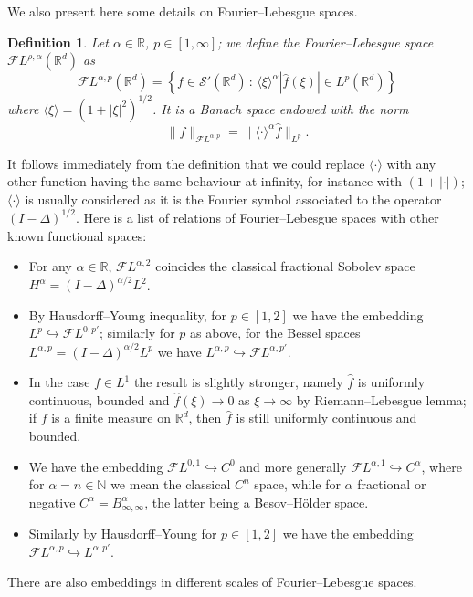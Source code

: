 \documentclass[10pt]{article}
\newtheorem{definition}[theorem]{Definition}
\begin{document}
We also present here some details on Fourier--Lebesgue spaces.

\begin{definition}
  \label{appendixA2 defn fourier lebesgue} Let $\alpha \in \mathbb{R}$, $p \in
  [1, \infty]$; we define the Fourier--Lebesgue space $\mathcal{F} L^{\rho,
  \alpha} (\mathbb{R}^d)$ as
  \[ \mathcal{F} L^{\alpha, p} (\mathbb{R}^d) = \left\{ f \in \mathcal{S}'
     (\mathbb{R}^d) \, : \, \langle \xi \rangle^{\alpha} | \hat{f} (\xi) | \in
     L^p (\mathbb{R}^d) \right\} \]
  where $\langle \xi \rangle = (1 + | \xi |^2)^{1 / 2}$. It is a Banach space
  endowed with the norm
  \[ \| f \|_{\mathcal{F} L^{\alpha, p}} = \| \langle \cdot \rangle^{\alpha}
     \hat{f} \|_{L^p} . \]
\end{definition}

It follows immediately from the definition that we could replace $\langle
\cdot \rangle$ with any other function having the same behaviour at infinity,
for instance with $(1 + | \cdot |)$; $\langle \cdot \rangle$ is usually
considered as it is the Fourier symbol associated to the operator $(I -
\Delta)^{1 / 2}$. Here is a list of relations of Fourier--Lebesgue spaces with
other known functional spaces:
\begin{itemize}
  \item For any $\alpha \in \mathbb{R}$, $\mathcal{F} L^{\alpha, 2}$ coincides
  the classical fractional Sobolev space $H^{\alpha} = (I - \Delta)^{\alpha /
  2} L^2$.
  
  \item By Hausdorff--Young inequality, for $p \in [1, 2]$ we have the
  embedding $L^p \hookrightarrow \mathcal{F} L^{0, p'}$; similarly for $p$ as
  above, for the Bessel spaces $L^{\alpha, p} = (I - \Delta)^{\alpha / 2} L^p$
  we have $L^{\alpha, p} \hookrightarrow \mathcal{F} L^{\alpha, p'}$.
  
  \item In the case $f \in L^1$ the result is slightly stronger, namely
  $\hat{f}$ is uniformly continuous, bounded and $\hat{f} (\xi) \rightarrow 0$
  as $\xi \rightarrow \infty$ by Riemann--Lebesgue lemma; if $f$ is a finite
  measure on $\mathbb{R}^d$, then $\hat{f}$ is still uniformly continuous and
  bounded.
  
  \item We have the embedding $\mathcal{F} L^{0, 1} \hookrightarrow C^0$ and
  more generally $\mathcal{F} L^{\alpha, 1} \hookrightarrow C^{\alpha}$, where
  for $\alpha = n \in \mathbb{N}$ we mean the classical $C^n$ space, while for
  $\alpha$ fractional or negative $C^{\alpha} = B^{\alpha}_{\infty, \infty}$,
  the latter being a Besov--H\"{o}lder space.
  
  \item Similarly by Hausdorff--Young for $p \in [1, 2]$ we have the embedding
  $\mathcal{F} L^{\alpha, p} \hookrightarrow L^{\alpha, p'}$.
\end{itemize}
There are also embeddings in different scales of Fourier--Lebesgue spaces.
\end{document}
